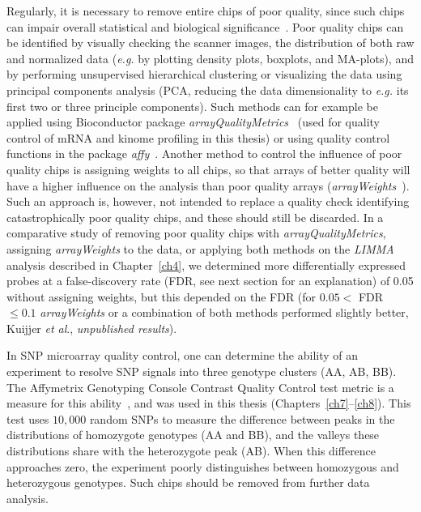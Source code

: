 Regularly, it is necessary to remove entire chips of poor quality, since such chips can impair overall statistical and biological significance~\cite{kauffmann2010microarray}. Poor quality chips can be identified by visually checking the scanner images, the distribution of both raw and normalized data ({\it e.g.} by plotting density plots, boxplots, and MA-plots), and by performing unsupervised hierarchical clustering or visualizing the data using principal components analysis (PCA, reducing the data dimensionality to {\it e.g.} its first two or three principle components). Such methods can for example be applied using Bioconductor package {\it arrayQualityMetrics}~\cite{kauffmann2009arrayqualitymetrics} (used for quality control of mRNA and kinome profiling in this thesis) or using quality control functions in the package {\it affy}~\cite{gautier2004affy}. Another method to control the influence of poor quality chips is assigning weights to all chips, so that arrays of better quality will have a higher influence on the analysis than poor quality arrays ({\it arrayWeights}~\cite{ritchie2006empirical}). Such an approach is, however, not intended to replace a quality check identifying catastrophically poor quality chips, and these should still be discarded. In a comparative study of removing poor quality chips with {\it arrayQualityMetrics}, assigning {\it arrayWeights} to the data, or applying both methods on the {\it LIMMA} analysis described in Chapter~\ref{ch4}, we determined more differentially expressed probes at a false\hyp{}discovery rate (FDR, see next section for an explanation) of 0.05 without assigning weights, but this depended on the FDR (for $0.05<$ FDR $\le0.1$ {\it arrayWeights} or a combination of both methods performed slightly better, Kuijjer {\it et al}., {\it unpublished results}).

In SNP microarray quality control, one can determine the ability of an experiment to resolve SNP signals into three genotype clusters (AA, AB, BB). The Affymetrix Genotyping Console Contrast Quality Control test metric is a measure for this ability~\cite{qualitycontrol}, and was used in this thesis (Chapters~\ref{ch7}--\ref{ch8}). This test uses $10,000$ random SNPs to measure the difference between peaks in the distributions of homozygote genotypes (AA and BB), and the valleys these distributions share with the heterozygote peak (AB). When this difference approaches zero, the experiment poorly distinguishes between homozygous and heterozygous genotypes. Such chips should be removed from further data analysis.

